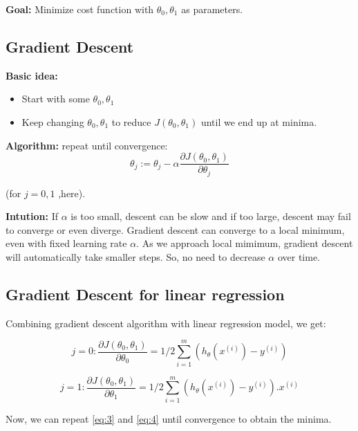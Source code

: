 \documentclass[12pt]{report}
\begin{document}
    \textbf{Goal:} Minimize cost function with $ \theta_0, \theta_1 $ as parameters.

  \subsection{Gradient Descent}

    \textbf{Basic idea:}
    \begin{itemize}
    \item Start with some $ \theta_0, \theta_1 $
    \item Keep changing $ \theta_0, \theta_1 $ to reduce $ J(\theta_0, \theta_1) $ until we end up at minima.
    \end{itemize} 

    \textbf{Algorithm:}
     repeat until convergence:
    \begin{equation} \label {eq:2}
    	\theta_j := \theta_j - \alpha \frac{\partial {J(\theta_0, \theta_1)}}{\partial \theta_j}
    \end{equation} 

    (for  $j = 0, 1 $  ,here).	

    \textbf{Intution:} 
    If $\alpha$ is too small, descent can be slow and if too large, descent may fail to converge or even diverge.
    Gradient descent can converge to a local minimum, even with fixed learning rate $\alpha$. As we approach local mimimum, gradient descent will automatically take smaller steps. So, no need to decrease $\alpha$ over time. 

  \subsection{Gradient Descent for linear regression}
    Combining gradient descent algorithm with linear regression model, we get:

    \begin{equation} \label {eq:3}
    	j = 0 : \frac{\partial {J(\theta_0, \theta_1)}}{\partial \theta_0} = 1/2 \sum_{i=1}^{m} (h_\theta(x^{(i)})-y^{(i)}) 
    \end{equation}

    \begin{equation} \label {eq:4}
    	j = 1 : \frac{\partial {J(\theta_0, \theta_1)}}{\partial \theta_1} = 1/2 \sum_{i=1}^{m} (h_\theta(x^{(i)})-y^{(i)}).x^{(i)}
    \end{equation}

    Now, we can repeat \ref{eq:3} and \ref{eq:4} until convergence to obtain the minima.
\end{document}
